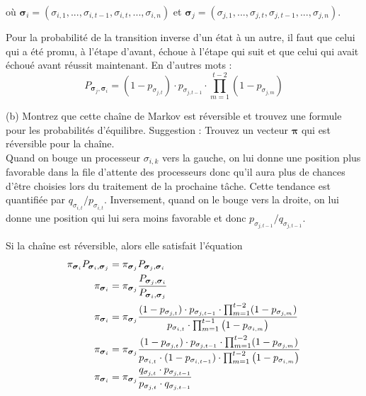 \documentclass{article}
\begin{document}
où $\boldsymbol{\sigma}_i=(\sigma_{i,1},...,\sigma_{i,t-1},\sigma_{i,t},...,\sigma_{i,n})$ et
$\boldsymbol{\sigma}_j=(\sigma_{j,1},...,\sigma_{j,t},\sigma_{j,t-1},...,\sigma_{j,n})$. 

\vspace{.2cm}
Pour la probabilité de la transition inverse d'un état à un autre, il faut que celui qui a été promu, à l'étape d'avant,
échoue à l'étape qui suit et que celui qui avait échoué avant réussit maintenant. En d'autres mots :
\[
    P_{{\boldsymbol{\sigma}_j,\boldsymbol{\sigma}_i}}=(1-p_{\sigma_{j,t}})\cdot p_{\sigma_{j,t-1}}\cdot\prod_{m=1}^{t-2}(1-p_{\sigma_{j,m}})
\]

\newpage
\noindent (b) Montrez que cette chaîne de Markov est réversible
et trouvez une formule pour les probabilités d'équilibre. Suggestion :
Trouvez un vecteur $\boldsymbol{\pi}$ qui est réversible pour la chaîne. \\


Quand on bouge un processeur $\sigma_{i,k}$ vers la gauche, on lui donne
une position plus favorable dans la file d'attente des processeurs donc 
qu'il aura plus de chances d'être choisies lors du traitement de la 
prochaine tâche. Cette tendance est quantifiée par 
$q_{\sigma_{i,t}}/p_{\sigma_{i,t}}$.
Inversement, quand on le bouge vers la droite, on lui
donne une position qui lui sera moins favorable et donc
$p_{\sigma_{j,t-1}}/q_{\sigma_{j,t-1}}$.

\vspace{.2cm}
Si la chaîne est réversible, alors elle satisfait l'équation
\begin{align}
    \pi_{\boldsymbol{\sigma}_i}P_{\boldsymbol{\sigma}_i,\boldsymbol{\sigma}_j}&=\pi_{\boldsymbol{\sigma}_j}P_{\boldsymbol{\sigma}_j,\boldsymbol{\sigma}_i} \\
    \pi_{\boldsymbol{\sigma}_i}&=\pi_{\boldsymbol{\sigma}_j}\frac{P_{\boldsymbol{\sigma}_j,\boldsymbol{\sigma}_i} }{P_{\boldsymbol{\sigma}_i,\boldsymbol{\sigma}_j}} \notag \\
    \pi_{\boldsymbol{\sigma}_i}&=\pi_{\boldsymbol{\sigma}_j}\frac{(1-p_{\sigma_{j,t}})\cdot p_{\sigma_{j,t-1}}\cdot\prod_{m=1}^{t-2}(1-p_{\sigma_{j,m}})}{p_{\sigma_{i,t}}\cdot\prod_{m=1}^{t-1}\left(1-p_{\sigma_{i,m}}\right)} \notag \\
    \pi_{\boldsymbol{\sigma}_i}&=\pi_{\boldsymbol{\sigma}_j}\frac{(1-p_{\sigma_{j,t}})\cdot p_{\sigma_{j,t-1}}\cdot\prod_{m=1}^{t-2}(1-p_{\sigma_{j,m}})}{p_{\sigma_{i,t}}\cdot(1-p_{\sigma_{i,t-1}})\cdot\prod_{m=1}^{t-2}\left(1-p_{\sigma_{i,m}}\right)} \notag \\
    \pi_{\boldsymbol{\sigma}_i}&=\pi_{\boldsymbol{\sigma}_j}\frac{q_{\sigma_{j,t}}\cdot p_{\sigma_{j,t-1}}}{p_{\sigma_{j,t}}\cdot q_{\sigma_{j,t-1}}}
\end{align}
\end{document}
